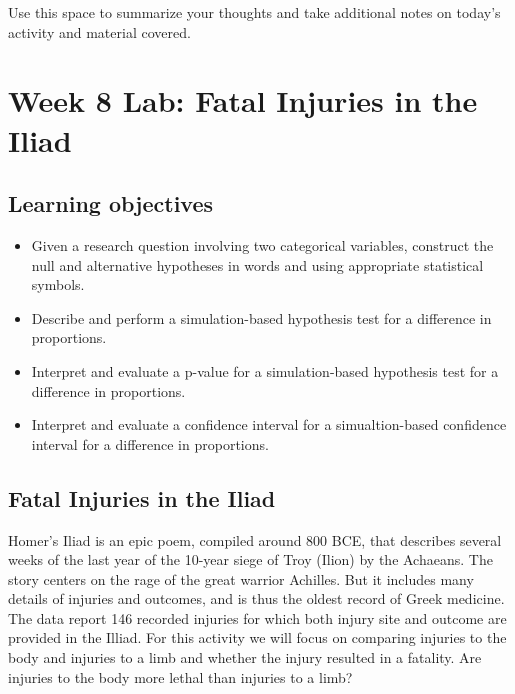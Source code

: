 \documentclass[
]{report}
\begin{document}
Use this space to summarize your thoughts and take additional notes on today's activity and material covered.

\newpage

\hypertarget{week-8-lab-fatal-injuries-in-the-iliad}{%
\section{Week 8 Lab: Fatal Injuries in the Iliad}\label{week-8-lab-fatal-injuries-in-the-iliad}}


\hypertarget{learning-objectives-12}{%
\subsection{Learning objectives}\label{learning-objectives-12}}

\begin{itemize}
\item
  Given a research question involving two categorical variables, construct the null and alternative hypotheses
  in words and using appropriate statistical symbols.
\item
  Describe and perform a simulation-based hypothesis test for a difference in proportions.
\item
  Interpret and evaluate a p-value for a simulation-based hypothesis test for a difference in proportions.
\item
  Interpret and evaluate a confidence interval for a simualtion-based confidence interval for a difference in proportions.
\end{itemize}

\hypertarget{fatal-injuries-in-the-iliad}{%
\subsection{Fatal Injuries in the Iliad}\label{fatal-injuries-in-the-iliad}}

Homer's Iliad is an epic poem, compiled around 800 BCE, that describes several weeks of the last year of the 10-year siege of Troy (Ilion) by the Achaeans. The story centers on the rage of the great warrior Achilles. But it includes many details of injuries and outcomes, and is thus the oldest record of Greek medicine. The data report 146 recorded injuries for which both injury site and outcome are provided in the Illiad. For this activity we will focus on comparing injuries to the body and injuries to a limb and whether the injury resulted in a fatality. Are injuries to the body more lethal than injuries to a limb?
\end{document}
